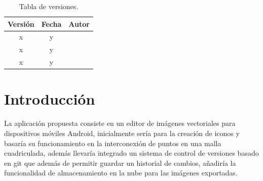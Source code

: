 \documentclass[a4paper,openright,12pt]{article}
\begin{document}
\newpage



\tableofcontents

\vspace{5cm}

\begin{flushright}
    \begin{table}[hbtp]
        \begin{center}
        
            \caption{Tabla de versiones.}
            \label{tabla:versiones}
            \small
            \vspace{1ex}
            
            \begin{tabular}{|c|c|l|}
                \hline
                Versión & Fecha & Autor \\
                \hline \hline
                x & y & \\ \hline
                x & y & \\ \hline
                x & y & \\ \hline
            \end{tabular}
            
        \end{center}
    \end{table}
\end{flushright}

\newpage
{}


\section{Introducción}\label{cap.introduccion}
La aplicación propuesta consiste en un editor de imágenes vectoriales para dispositivos móviles Android, inicialmente sería para la creación de iconos y basaría su funcionamiento en la interconexión de puntos en una malla cuadriculada, además llevaría integrado un sistema de control de versiones basado en git que además de permitir guardar un historial de cambios, añadiría la funcionalidad de almacenamiento en la nube para las imágenes exportadas.
\end{document}
